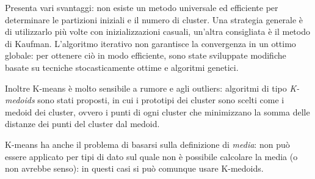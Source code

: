 \documentclass[12pt]{report}
\begin{document}
Presenta vari svantaggi: non esiste un metodo universale ed efficiente per determinare le partizioni iniziali e il numero di cluster. Una strategia generale è di utilizzarlo più volte con inizializzazioni casuali, un'altra consigliata è il metodo di Kaufman. L'algoritmo iterativo non garantisce la convergenza in un ottimo globale: per ottenere ciò in modo efficiente, sono state sviluppate modifiche basate su tecniche stocasticamente ottime e algoritmi genetici.

Inoltre K-means è molto sensibile a rumore e agli outliers: algoritmi di tipo \textit{K-medoids} sono stati proposti, in cui i prototipi dei cluster sono scelti come i medoid dei cluster, ovvero i punti di ogni cluster che minimizzano la somma delle distanze dei punti del cluster dal medoid.

K-means ha anche il problema di basarsi sulla definizione di \textit{media}: non può essere applicato per tipi di dato sul quale non è possibile calcolare la media (o non avrebbe senso): in questi casi si può comunque usare K-medoids.
\end{document}
